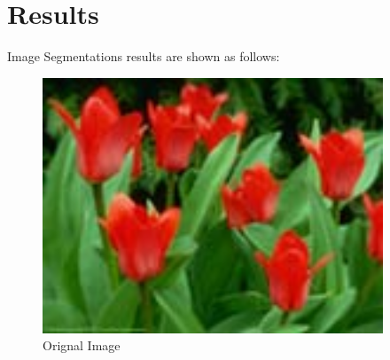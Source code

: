 \documentclass[a4paper, 12pt]{article}
\begin{document}
\newpage

\section{Results}

Image Segmentations results are shown as follows:

\begin{figure}[H]
  \centering
  \includegraphics[width=4in]{flowers}
  \caption{Orignal Image}
\end{figure}
 
\end{document}
